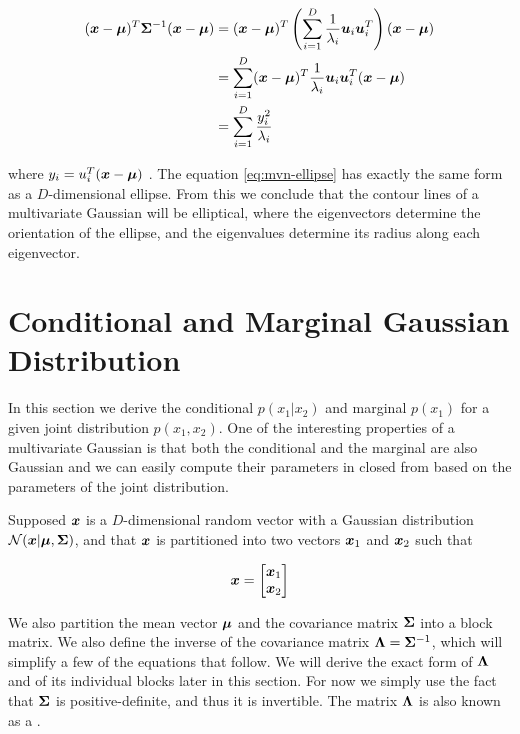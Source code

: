 \begin{tcolorbox}
    \begin{align}
    ({\bm{x}} - {\bm{\mu}})^T {\bm{\Sigma}}^{-1} ({\bm{x}} - {\bm{\mu}}) &= ({\bm{x}} - {\bm{\mu}})^T \left( \sum_{i = 1}^D \frac{1}{\lambda_i} {\bm{u}}_i {\bm{u}}_i^T \right) ({\bm{x}} - {\bm{\mu}}) \\
    &= \sum_{i = 1}^D ({\bm{x}} - {\bm{\mu}})^T \frac{1}{\lambda_i} {\bm{u}}_i {\bm{u}}_i^T ({\bm{x}} - {\bm{\mu}}) \\
    &= \sum_{i = 1}^D \frac{y_i^2}{\lambda_i} \label{eq:mvn-ellipse}
    \end{align}
    
    where $y_i = u_{i}^{T} ({\bm{x}} - {\bm{\mu}})$ . The equation \eqref{eq:mvn-ellipse} has exactly the same form as a $D$-dimensional ellipse. From this we conclude that the contour lines of a multivariate Gaussian will be elliptical, where the eigenvectors determine the orientation of the ellipse, and the eigenvalues determine its radius  along each eigenvector.
    
\end{tcolorbox}





\section{Conditional and Marginal Gaussian Distribution}

In this section we derive the conditional $p(x_1 | x_2)$ and marginal $p(x_1)$ for a given joint distribution $p(x_1, x_2)$. One of the interesting properties of a multivariate Gaussian is that both the conditional and the marginal are also Gaussian and we can easily compute their parameters in closed from based on the parameters of the joint distribution.

Supposed ${\bm{x}}$ is a $D$-dimensional random vector with a Gaussian distribution ${\mathcal{N}}({\bm{x}} | {\bm{\mu}}, {\bm{\Sigma}})$, and that ${\bm{x}}$ is partitioned into two vectors ${\bm{x}}_1$ and ${\bm{x}}_2$ such that

\begin{equation}
{\bm{x}} = {\begin{bmatrix} {\bm{x}}_1 \\ {\bm{x}}_2 \end{bmatrix}}
\end{equation}

We also partition the mean vector ${\bm{\mu}}$ and the covariance matrix ${\bm{\Sigma}}$ into a block matrix. We also define the inverse of the covariance matrix ${\bm{\Lambda}} = {\bm{\Sigma}}^{-1}$, which will simplify a few of the equations that follow. We will derive the exact form of ${\bm{\Lambda}}$ and of its individual blocks later in this section. For now we simply use the fact that ${\bm{\Sigma}}$ is positive-definite, and thus it is invertible. The matrix ${\bm{\Lambda}}$ is also known as a .

